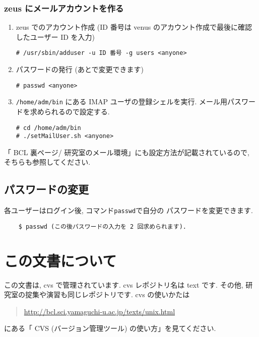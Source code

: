 \documentclass{jarticle}
\begin{document}
\subsubsection{zeus にメールアカウントを作る}
\begin{enumerate}
	\item zeus でのアカウント作成 (ID 番号は venus のアカウント作成で最後に確認
	      したユーザー ID を入力)
\begin{verbatim}
# /usr/sbin/adduser -u ID 番号 -g users <anyone>
\end{verbatim}
	\item パスワードの発行 (あとで変更できます)
\begin{verbatim}
# passwd <anyone>
\end{verbatim}
	\item \verb|/home/adm/bin| にある IMAP ユーザの登録シェルを実行.
	      メール用パスワードを求められるので設定する.
\begin{verbatim}
# cd /home/adm/bin
# ./setMailUser.sh <anyone>
\end{verbatim}
\end{enumerate}
「 BCL 裏ページ/ 研究室のメール環境」にも設定方法が記載されているので,
そちらも参照してください.



\subsection{パスワードの変更}
各ユーザーはログイン後, コマンド\verb|passwd|で自分の
パスワードを変更できます.
\begin{verbatim}
    $ passwd (この後パスワードの入力を 2 回求められます).
\end{verbatim}


\section{この文書について}

この文書は, cvs で管理されています. cvs レポジトリ名は text です.
その他, 研究室の掟集や演習も同じレポジトリです.
cvs の使いかたは
\begin{quote}
\url{http://bcl.sci.yamaguchi-u.ac.jp/texts/unix.html}
\end{quote}
にある「 CVS (バージョン管理ツール) の使い方」を見てください.
\end{document}
